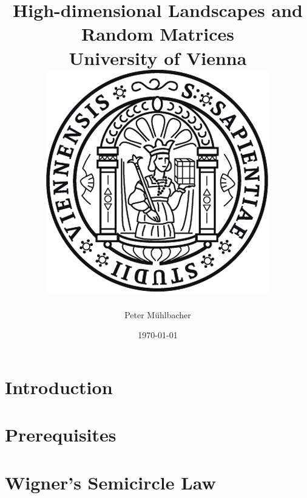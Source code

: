 \documentclass[11pt]{report}
\begin{document}
\title{
	{High-dimensional Landscapes and Random Matrices}\\
	{\large University of Vienna}\\
	{\includegraphics{university.png}}
}
\author{Peter Mühlbacher}
\date{\today}
\maketitle

\begin{abstract}
\end{abstract}

\tableofcontents

\chapter*{Introduction}


\chapter{Prerequisites}\label{chap:prerequisites}


\appendix
\chapter{Wigner's Semicircle Law}




\end{document}
